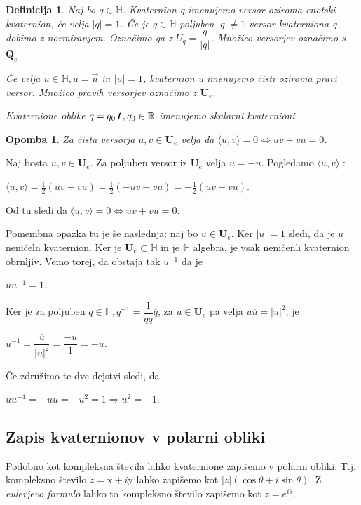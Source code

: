 \documentclass[a4paper,12pt]{article}
\def\R{\mathbb{R}} %
\def\H{\mathbb{H}} %
\def\Qe{\textbf{Q}_{e}} %
\def\Ue{\textbf{U}_{e}} %
\def\1{\textbf{\emph{1}}}
\newcommand{\dotpr}[2]{\langle #1, #2 \rangle}
\newtheorem{opomba}{Opomba}
\newtheorem{definicija}{Definicija}
\begin{document}
\begin{definicija}
   Naj bo $q \in \H$. Kvaternion q imenujemo \emph{versor} oziroma \emph{enotski kvaternion}, če velja
   $|q| = 1$. Če je $q \in \H$ poljuben $|q| \neq 1$ versor kvaterniona q dobimo z normiranjem. Označimo ga z $U_{q} = \dfrac{q}{|q|}$. 
   Množico versorjev označimo s $\Qe$

   Če velja $u \in \H, u = \vec{u}$ in $|u| = 1$, kvaternion u imenujemo \emph{čisti} oziroma \emph{pravi} versor.
   Množico pravih versorjev označimo z $\Ue$.

   Kvaternione oblike $q = q_{0}\1, q_{0} \in \R$ imenujemo \emph{skalarni kvaternioni.}
\end{definicija}
\begin{opomba}
   Za čista versorja $u, v \in \Ue$ velja da $\dotpr{u}{v} = 0 \iff uv + vu = 0$.
\end{opomba}
Naj bosta $u, v \in \Ue$. Za poljuben versor iz $\Ue$ velja $\overline{u} = -u$. Pogledamo $\dotpr{u}{v}$ :
\begin{center}
   $\dotpr{u}{v} = \frac{1}{2}(\overline{u}v + \overline{v}u) = \frac{1}{2}(-uv -vu) = -\frac{1}{2}(uv + vu)$.
\end{center}
Od tu sledi da $\dotpr{u}{v} = 0 \iff uv + vu = 0$.

\break
Pomembna opazka tu je še naslednja: naj bo $u \in \Ue$. Ker $|u| = 1$ sledi, da je $u$ neničeln kvaternion.
Ker je $\Ue \subset \H$ in je $\H$ algebra, je vsak neničenli kvaternion obrnljiv. Vemo torej, da obstaja tak $u^{-1}$ da je
\begin{center}
   $uu^{-1} = 1$.
\end{center}
Ker je za poljuben $q \in \H, q^{-1} = \dfrac{1}{\overline{q}q} \overline{q}$, za $u \in \Ue$ pa velja $u\overline{u} = |u|^2$, je 
\begin{center}
   $u^{-1} = \dfrac{\overline{u}}{|u|^2} = \dfrac{-u}{1} = -u$.
\end{center}
Če združimo te dve dejstvi sledi, da
\begin{center}
   $uu^{-1} = -uu = -u^2 = 1 \Rightarrow u^2 = -1$.
\end{center}

\subsection{Zapis  kvaternionov v polarni obliki}

Podobno kot kompleksna števila lahko kvaternione zapišemo v polarni obliki. T.j.
kompleksno število $z = \text{x} + i\text{y}$ lahko zapišemo kot $|z|( \cos\theta + i\sin\theta )$. Z \emph{eulerjevo formulo} lahko to kompleksno število
zapišemo kot $z = e^{i\theta}$.
\end{document}
